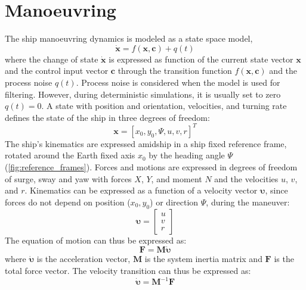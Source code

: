 \section{Manoeuvring} \label{sec:manoeuvring}
The ship manoeuvring dynamics is modeled as a state space model,
\begin{equation}
    \dot{\mathbf{x}}=f(\mathbf{x},\mathbf{c}) + q(t)
    \label{eq:state_space}
\end{equation}
where the change of state $\dot{\mathbf{x}}$ is expressed as function of the current state vector $\mathbf{x}$ and the control input vector $\mathbf{c}$ through the transition function $f(\mathbf{x},\mathbf{c})$ and the process noise $q(t)$.  Process noise is considered when the model is used for filtering. However,  during deterministic simulations, it is usually set to zero $q(t)=0$.
A state with position and orientation, velocities, and turning rate defines the state of the ship in three degrees of freedom: 
\begin{equation}
    \mathbf{x} = [x_0,y_0,\Psi, u,v,r]^T
    \label{eq:state}
\end{equation}
The ship’s kinematics are expressed amidship in a ship fixed reference frame, rotated around the Earth fixed axis $x_0$ by the heading angle $\Psi$ (\autoref{fig:reference_frames}). Forces and motions are expressed in degrees of freedom of surge, sway and yaw with forces $X$, $Y$, and moment $N$ and the velocities $u$, $v$, and $r$. Kinematics can be expressed as a function of a velocity vector $\pmb{\upsilon}$, since forces do not depend on position ($x_0,y_0$) or direction $\Psi$, during the maneuver:
\begin{equation}
    \label{eq:upsilon}
    \pmb{\upsilon} = \left[\begin{matrix}u\\v\\r\end{matrix}\right]
\end{equation}
The equation of motion can thus be expressed as:
\begin{equation}
    \label{eq:eom}
    \mathbf{F} = \mathbf{M}  \pmb{\dot{\upsilon}} 
\end{equation}
where $\pmb{\dot{\upsilon}}$ is the acceleration vector, $\mathbf{M}$ is the system inertia matrix and $\mathbf{F}$ is the total force vector.
The velocity transition can thus be expressed as:
\begin{equation}
    \label{eq:acc}
    \pmb{\dot{\upsilon}} = \mathbf{M}^{-1}\mathbf{F}
\end{equation}
